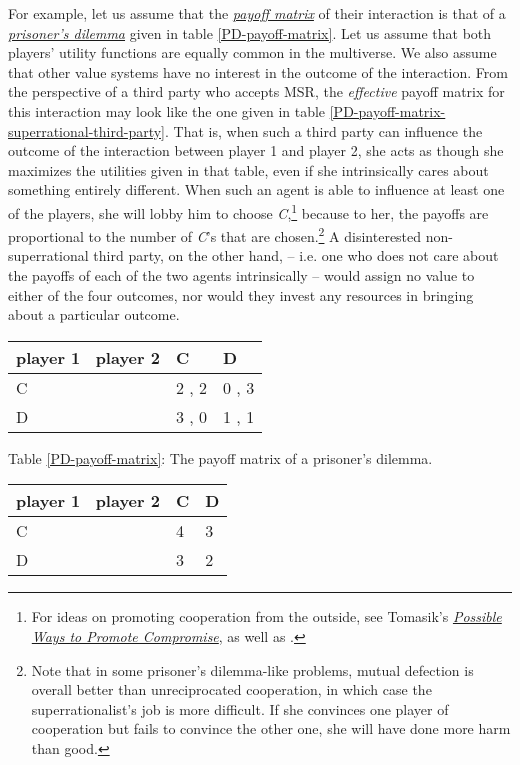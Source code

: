 For example, let us assume that the
\href{https://en.wikipedia.org/wiki/Normal-form_game}{\emph{payoff
matrix}} of their interaction is that of a
\href{https://en.wikipedia.org/wiki/Prisoner\%27s_dilemma}{\emph{prisoner's
dilemma}} given in table \ref{PD-payoff-matrix}. Let us
assume that both players' utility functions are equally common in the
multiverse. We also assume that other value systems have no interest in
the outcome of the interaction. From the perspective of a third party
who accepts MSR, the \emph{effective} payoff matrix for this interaction
may look like the one given in table
\ref{PD-payoff-matrix-superrational-third-party}. That
is, when such a third party can influence the outcome of the interaction
between player 1 and player 2, she acts as though she maximizes the
utilities given in that table, even if she intrinsically cares about
something entirely different. When such an agent is able to influence at
least one of the players, she will lobby him to choose
\emph{C},\footnote{For ideas on promoting cooperation from the outside,
  see Tomasik's
  \href{https://foundational-research.org/possible-ways-to-promote-compromise/}{\emph{Possible
  Ways to Promote Compromise}}, as well as
  \parencite{Axelrod2006-ci}.} because to her, the payoffs
are proportional to the number of \emph{C}'s that are chosen.\footnote{Note
  that in some prisoner's dilemma-like problems, mutual defection is
  overall better than unreciprocated cooperation, in which case the
  superrationalist's job is more difficult. If she convinces one player
  of cooperation but fails to convince the other one, she will have done
  more harm than good.} A disinterested non-superrational third party,
on the other hand, -- i.e. one who does not care about the payoffs of
each of the two agents intrinsically -- would assign no value to either
of the four outcomes, nor would they invest any resources in bringing
about a particular outcome.

\begin{longtable}[]{@{}lll@{}}
\toprule
player 1 \ player 2 & C & D\tabularnewline
\midrule
\endhead
C & 2 , 2 & 0 , 3\tabularnewline
D & 3 , 0 & 1 , 1\tabularnewline
\bottomrule
\end{longtable}

Table \ref{PD-payoff-matrix}: The payoff matrix of a prisoner's dilemma.

\begin{longtable}[]{@{}lll@{}}
\toprule
player 1 \ player 2 & C & D\tabularnewline
\midrule
\endhead
C & 4 & 3\tabularnewline
D & 3 & 2\tabularnewline
\bottomrule
\end{longtable}

